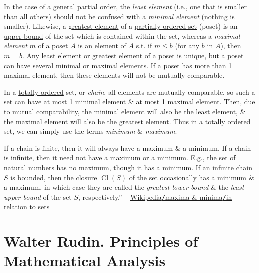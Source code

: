 \documentclass[oneside]{book}
\numberwithin{equation}{section}
\begin{document}
In the case of a general \href{https://en.wikipedia.org/wiki/Partial_order}{partial order}, the \textit{least element} (i.e., one that is smaller than all others) should not be confused with a \textit{minimal element} (nothing is smaller). Likewise, a \href{https://en.wikipedia.org/wiki/Greatest_element}{greatest element} of a \href{https://en.wikipedia.org/wiki/Partially_ordered_set}{partially ordered set} (poset) is an \href{https://en.wikipedia.org/wiki/Upper_bound}{upper bound} of the set which is contained within the set, whereas a \textit{maximal element} $m$ of a poset $A$ is an element of $A$ s.t. if $m\le b$ (for any $b$ in $A$), then $m = b$. Any least element or greatest element of a poset is unique, but a poset can have several minimal or maximal elements. If a poset has more than 1 maximal element, then these elements will not be mutually comparable.

In a \href{https://en.wikipedia.org/wiki/Total_order}{totally ordered} set, or \textit{chain}, all elements are mutually comparable, so such a set can have at most 1 minimal element \& at most 1 maximal element. Then, due to mutual comparability, the minimal element will also be the least element, \& the maximal element will also be the greatest element. Thus in a totally ordered set, we can simply use the terms \textit{minimum} \& \textit{maximum}.

If a chain is finite, then it will always have a maximum \& a minimum. If a chain is infinite, then it need not have a maximum or a minimum. E.g., the set of \href{https://en.wikipedia.org/wiki/Natural_number}{natural numbers} has no maximum, though it has a minimum. If an infinite chain $S$ is bounded, then the \href{https://en.wikipedia.org/wiki/Topological_closure}{closure} $\operatorname{Cl}(S)$ of the set occasionally has a minimum \& a maximum, in which case they are called the \textit{greatest lower bound} \& the \textit{least upper bound} of the set $S$, respectively.'' -- \href{https://en.wikipedia.org/wiki/Maxima_and_minima#In_relation_to_sets}{Wikipedia\texttt{/}maxima \& minima\texttt{/}in relation to sets}


\chapter{Walter Rudin. Principles of Mathematical Analysis}



\printbibliography[heading=bibintoc]
	
\end{document}
